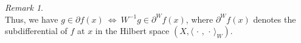 \documentclass[11pt]{article}
\theoremstyle{plain}
\theoremstyle{definition}
\theoremstyle{remark}
\newtheorem{remark}[theorem]{Remark}
\newcommand{\norm}[1]{\lVert{#1}\rVert}
\newcommand{\scalarp}[1]{\langle{#1}\rangle}
\newcommand{\HH}{X}
\newcommand{\R}{\mathbb{R}}
\newcommand{\x}{x}
\newcommand{\y}{y}
\newcommand{\uu}{g}
\newcommand{\W}{W}
\begin{document}
\begin{remark}
\begin{equation*}
\end{equation*}
Thus, we have $ \uu\in \partial f(\x)\ \Leftrightarrow\ \W^{-1}\uu\in \partial^{\W}\!f(\x)$, where $\partial^{\W}\!f(\x)$ denotes the subdifferential of $f$ at $\x$ in the Hilbert space $(\HH, \scalarp{\,\cdot\,, \,\cdot\,}_{\W})$. 
\end{remark}
\end{document}
